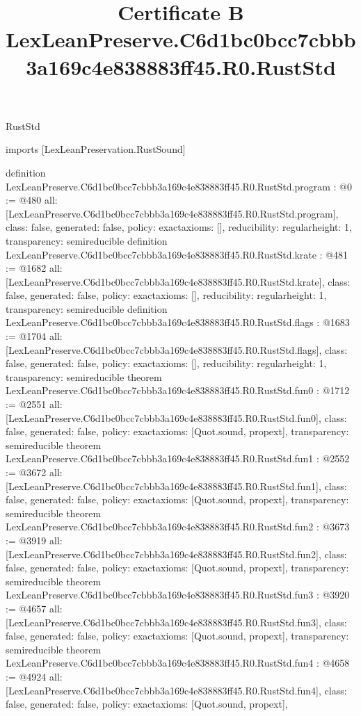 \begin{lexlean}{RustStd}
\title{Certificate B LexLeanPreserve.C6d1bc0bcc7cbbb3a169c4e838883ff45.R0.RustStd}
\begin{coremodule}
imports [LexLeanPreservation.RustSound]

definition LexLeanPreserve.C6d1bc0bcc7cbbb3a169c4e838883ff45.R0.RustStd.program : @0 := @480 {
  all: [LexLeanPreserve.C6d1bc0bcc7cbbb3a169c4e838883ff45.R0.RustStd.program],
  class: false,
  generated: false,
  policy: exact{axioms: []},
  reducibility: regular{height: 1},
  transparency: semireducible
}
definition LexLeanPreserve.C6d1bc0bcc7cbbb3a169c4e838883ff45.R0.RustStd.krate : @481 := @1682 {
  all: [LexLeanPreserve.C6d1bc0bcc7cbbb3a169c4e838883ff45.R0.RustStd.krate],
  class: false,
  generated: false,
  policy: exact{axioms: []},
  reducibility: regular{height: 1},
  transparency: semireducible
}
definition LexLeanPreserve.C6d1bc0bcc7cbbb3a169c4e838883ff45.R0.RustStd.flags : @1683 := @1704 {
  all: [LexLeanPreserve.C6d1bc0bcc7cbbb3a169c4e838883ff45.R0.RustStd.flags],
  class: false,
  generated: false,
  policy: exact{axioms: []},
  reducibility: regular{height: 1},
  transparency: semireducible
}
theorem LexLeanPreserve.C6d1bc0bcc7cbbb3a169c4e838883ff45.R0.RustStd.fun0 : @1712 := @2551 {
  all: [LexLeanPreserve.C6d1bc0bcc7cbbb3a169c4e838883ff45.R0.RustStd.fun0],
  class: false,
  generated: false,
  policy: exact{axioms: [Quot.sound, propext]},
  transparency: semireducible
}
theorem LexLeanPreserve.C6d1bc0bcc7cbbb3a169c4e838883ff45.R0.RustStd.fun1 : @2552 := @3672 {
  all: [LexLeanPreserve.C6d1bc0bcc7cbbb3a169c4e838883ff45.R0.RustStd.fun1],
  class: false,
  generated: false,
  policy: exact{axioms: [Quot.sound, propext]},
  transparency: semireducible
}
theorem LexLeanPreserve.C6d1bc0bcc7cbbb3a169c4e838883ff45.R0.RustStd.fun2 : @3673 := @3919 {
  all: [LexLeanPreserve.C6d1bc0bcc7cbbb3a169c4e838883ff45.R0.RustStd.fun2],
  class: false,
  generated: false,
  policy: exact{axioms: [Quot.sound, propext]},
  transparency: semireducible
}
theorem LexLeanPreserve.C6d1bc0bcc7cbbb3a169c4e838883ff45.R0.RustStd.fun3 : @3920 := @4657 {
  all: [LexLeanPreserve.C6d1bc0bcc7cbbb3a169c4e838883ff45.R0.RustStd.fun3],
  class: false,
  generated: false,
  policy: exact{axioms: [Quot.sound, propext]},
  transparency: semireducible
}
theorem LexLeanPreserve.C6d1bc0bcc7cbbb3a169c4e838883ff45.R0.RustStd.fun4 : @4658 := @4924 {
  all: [LexLeanPreserve.C6d1bc0bcc7cbbb3a169c4e838883ff45.R0.RustStd.fun4],
  class: false,
  generated: false,
  policy: exact{axioms: [Quot.sound, propext]},
}
\end{coremodule}
\end{lexlean}
